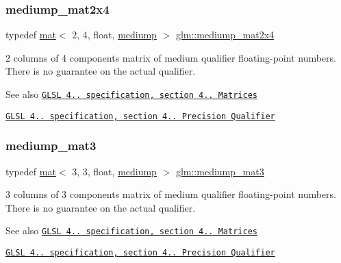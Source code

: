\subsubsection{\texorpdfstring{mediump\+\_\+mat2x4}{mediump\_mat2x4}}
{\footnotesize\ttfamily typedef \hyperlink{structglm_1_1mat}{mat}$<$ 2, 4, float, \hyperlink{namespaceglm_a36ed105b07c7746804d7fdc7cc90ff25a6416f3ea0c9025fb21ed50c4d6620482}{mediump} $>$ \hyperlink{group__core__precision_ga9778942a37cd364cc4129cbf423df429}{glm\+::mediump\+\_\+mat2x4}}

2 columns of 4 components matrix of medium qualifier floating-\/point numbers. There is no guarantee on the actual qualifier.

\begin{DoxySeeAlso}{See also}
\href{http://www.opengl.org/registry/doc/GLSLangSpec.4.20.8.pdf}{\tt G\+L\+SL 4.. specification, section 4.. Matrices} 

\href{http://www.opengl.org/registry/doc/GLSLangSpec.4.20.8.pdf}{\tt G\+L\+SL 4.. specification, section 4.. Precision Qualifier} 
\end{DoxySeeAlso}
\mbox{\label{group__core__precision_ga718616ee458f17e2525641b94975c184}} 
\subsubsection{\texorpdfstring{mediump\+\_\+mat3}{mediump\_mat3}}
{\footnotesize\ttfamily typedef \hyperlink{structglm_1_1mat}{mat}$<$ 3, 3, float, \hyperlink{namespaceglm_a36ed105b07c7746804d7fdc7cc90ff25a6416f3ea0c9025fb21ed50c4d6620482}{mediump} $>$ \hyperlink{group__core__precision_ga718616ee458f17e2525641b94975c184}{glm\+::mediump\+\_\+mat3}}

3 columns of 3 components matrix of medium qualifier floating-\/point numbers. There is no guarantee on the actual qualifier.

\begin{DoxySeeAlso}{See also}
\href{http://www.opengl.org/registry/doc/GLSLangSpec.4.20.8.pdf}{\tt G\+L\+SL 4.. specification, section 4.. Matrices} 

\href{http://www.opengl.org/registry/doc/GLSLangSpec.4.20.8.pdf}{\tt G\+L\+SL 4.. specification, section 4.. Precision Qualifier} 
\end{DoxySeeAlso}
\mbox{\label{group__core__precision_ga1215c51719dd5e01efb27ff525e431fb}} 

